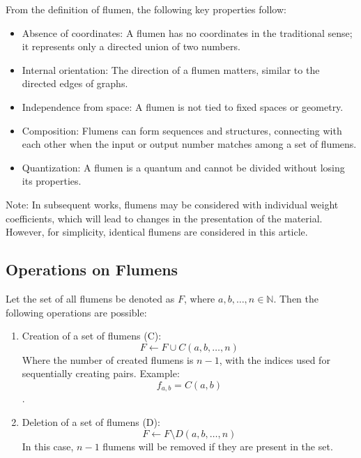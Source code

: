 \documentclass[final]{article}
\begin{document}
        From the definition of flumen, the following key properties follow:
        \begin{itemize}
            \item Absence of coordinates: A flumen has no coordinates in the traditional
            sense; it represents only a directed union of two
            numbers.
            \item Internal orientation: The direction of a flumen matters, similar to the directed edges of graphs.
            \item Independence from space: A flumen is not tied to fixed
            spaces or geometry.
            \item Composition: Flumens can form sequences and
            structures, connecting with each other when the input
            or output number matches among a set of flumens.
            \item Quantization: A flumen is a quantum and cannot be divided
            without losing its properties.
        \end{itemize}

        Note: In subsequent works, flumens may be considered with
        individual weight coefficients, which will lead to changes in
        the presentation of the material. However, for simplicity, identical
        flumens are considered in this article.


    \subsection{Operations on Flumens}

        Let the set of all flumens be denoted as \( F \), where \( a, b, \dots,
        n \in \mathbb{N} \). Then the following operations are possible:

        \begin{enumerate}

            \item Creation of a set of flumens (C): \[ F \leftarrow F \cup C(a,b,
            \dots, n) \] Where the number of created flumens is \( n-1 \), with
            the indices used for sequentially creating pairs. Example: \[
            f_{a,b}=C(a,b) \].

            \item Deletion of a set of flumens (D): \[ F \leftarrow F \setminus
            D(a,b, \dots, n) \] In this case, \( n-1 \) flumens will be removed if
            they are present in the set.

        \end{enumerate}
\end{document}
